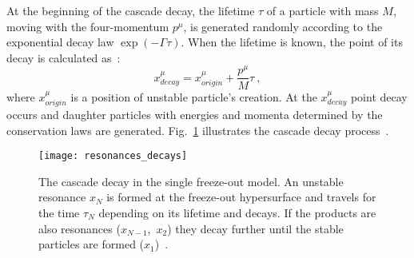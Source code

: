       At the beginning of the cascade decay, the lifetime $\tau$ of a particle with mass $M$, moving with the four-momentum $p^\mu$, is generated randomly according to the exponential decay law $\exp(-\Gamma\tau)$.
      When the lifetime is known, the point of its decay is calculated as~\cite{therminator}:
      \begin{equation}
        x^\mu_{decay} = x^\mu_{origin} + \frac{p^\mu}{M}\tau~,
      \end{equation}
      where $x^\mu_{origin}$ is a position of unstable particle's creation.
      At the $x^\mu_{decay}$ point decay occurs and daughter particles with energies and momenta determined by the conservation laws are generated.
      Fig.~\ref{fig:resonances-decay} illustrates the cascade decay process~\cite{therminator}.
      \begin{figure}[h]
        \centering
        \texttt{[image: resonances\_decays]}
        \caption{The cascade decay in the single freeze-out model. An unstable resonance $x_N$ is formed at the freeze-out hypersurface and travels for the time $\tau_N$ depending on its lifetime and decays. If the products are also resonances \mbox{($x_{N-1}$, $x_2$)} they decay further until the stable particles are formed ($x_1$)~\cite{therminator}.}
        \label{fig:resonances-decay}
      \end{figure}